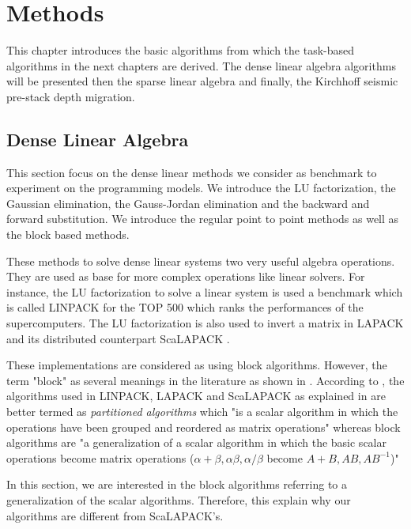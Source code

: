 \chapter{Methods \label{chap:methods}}
\graphicspath{{chapters/methods/}}
This chapter introduces the basic algorithms from which the task-based algorithms in the next chapters are derived.
The dense linear algebra algorithms will be presented then the sparse linear algebra and finally, the Kirchhoff seismic pre-stack depth migration.

\section{Dense Linear Algebra}

This section focus on the dense linear methods we consider as benchmark to experiment on the programming models.
We introduce the LU factorization, the Gaussian elimination, the Gauss-Jordan elimination and the backward and forward substitution.
We introduce the regular point to point methods as well as the block based methods.


These methods to solve dense linear systems two very useful algebra operations.
They are used as base for more complex operations like linear solvers.
For instance, the LU factorization to solve a linear system is used a benchmark which is called LINPACK \cite{Parle1981} \cite{DonLP2003} for the TOP 500 which ranks the performances of the supercomputers.
The LU factorization is also used to invert a matrix in LAPACK \cite{ABBBD1999} and its distributed counterpart ScaLAPACK \cite{ChDPW1992} \cite{BCCDD1996}.

These implementations are considered as using block algorithms.
However, the term "block" as several meanings in the literature as shown in \cite{DemHS1995}.
According to \cite{DemHS1995}, the algorithms used in LINPACK, LAPACK and ScaLAPACK as explained in \cite{CDOPW1996} are better termed as \textit{partitioned algorithms} which "is a scalar algorithm in which the operations have been grouped and reordered as matrix operations" whereas block algorithms are "a generalization of a scalar algorithm in which the basic scalar operations become matrix operations ($\alpha + \beta, \alpha\beta, \alpha / \beta$ become $A+B, AB, AB^{-1}$)"

In this section, we are interested in the block algorithms referring to a generalization of the scalar algorithms.
Therefore, this explain why our algorithms are different from ScaLAPACK's.



